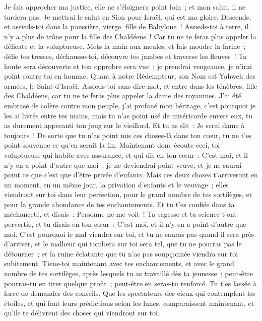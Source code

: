 \begin{multicols}{2}
Je fais approcher ma justice, elle ne s'éloignera point loin~; et mon salut, il ne tardera pas. Je mettrai le salut en Sion pour Israël, qui est ma gloire.
\VerseOne{}Descends, et assieds-toi dans la poussière, vierge, fille de Babylone~! Assieds-toi à terre, il n'y a plus de trône pour la fille des Chaldéens~! Car tu ne te feras plus appeler la délicate et la voluptueuse.
Mets la main aux meules, et fais moudre la farine~; délie tes tresses, déchausse-toi, découvre tes jambes et traverse les fleuves~!
Ta honte sera découverte et ton opprobre sera vue~; je prendrai vengeance, je n'irai point contre toi en homme.
Quant à notre Rédempteur, son Nom est Yahweh des armées, le Saint d'Israël.
Assieds-toi sans dire mot, et entre dans les ténèbres, fille des Chaldéens, car tu ne te feras plus appeler la dame des royaumes.
J'ai été embrasé de colère contre mon peuple, j'ai profané mon héritage, c'est pourquoi je les ai livrés entre tes mains, mais tu n'as point usé de miséricorde envers eux, tu as durement appesanti ton joug sur le vieillard.
Et tu as dit~: Je serai dame à toujours~! De sorte que tu n'as point mis ces choses-là dans ton cœur, tu ne t'es point souvenue ce qu'en serait la fin.
Maintenant donc écoute ceci, toi voluptueuse qui habite avec assurance, et qui dis en ton cœur~: C'est moi, et il n'y en a point d'autre que moi~; je ne deviendrai point veuve, et je ne saurai point ce que c'est que d'être privée d'enfants.
Mais ces deux choses t'arriveront en un moment, en un même jour, la privation d'enfants et le veuvage~; elles viendront sur toi dans leur perfection, pour le grand nombre de tes sortilèges, et pour la grande abondance de tes enchantements.
Et tu t'es confiée dans ta méchanceté, et disais~: Personne ne me voit~! Ta sagesse et ta science t'ont pervertie, et tu disais en ton cœur~: C'est moi, et il n'y en a point d'autre que moi.
 C'est pourquoi le mal viendra sur toi, et tu ne sauras pas quand il sera près d'arriver, et le malheur qui tombera sur toi sera tel, que tu ne pourras pas le détourner~; et la ruine éclatante que tu n'as pas soupçonnée viendra sur toi subitement.
Tiens-toi maintenant avec tes enchantements, et avec le grand nombre de tes sortilèges, après lesquels tu as travaillé dès ta jeunesse~; peut-être pourras-tu en tirer quelque profit~; peut-être en seras-tu renforcé.
Tu t'es lassée à force de demander des conseils. Que les spectateurs des cieux qui contemplent les étoiles, et qui font leurs prédictions selon les lunes, comparaissent maintenant, et qu'ils te délivrent des choses qui viendront sur toi.

\end{multicols}
